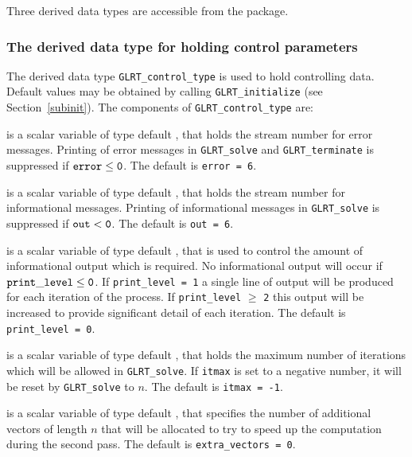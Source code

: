 \documentclass{galahad}
\newcommand{\packagename}{GL\-RT}
\begin{document}

\galtypes
Three derived data types are accessible from the package.


\subsubsection{The derived data type for holding control
 parameters}\label{typecontrol}
The derived data type
{\tt \packagename\_control\_type}
is used to hold controlling data. Default values may be obtained by calling
{\tt \packagename\_initialize}
(see Section~\ref{subinit}). The components of
{\tt \packagename\_control\_type}
are:

\begin{description}
 is a scalar variable of type default \integer, that holds the
stream number for error messages.
Printing of error messages in
{\tt \packagename\_solve} and {\tt \packagename\_terminate}
is suppressed if ${\tt error} \leq {\tt 0}$.
The default is {\tt error = 6}.

 is a scalar variable of type default \integer, that holds the
stream number for informational messages.
Printing of informational messages in
{\tt \packagename\_solve} is suppressed if ${\tt out} < {\tt 0}$.
The default is {\tt out = 6}.

 is a scalar variable of type default \integer,
that is used
to control the amount of informational output which is required. No
informational output will occur if ${\tt print\_level} \leq {\tt 0}$. If
{\tt print\_level = 1} a single line of output will be produced for each
iteration of the process. If {\tt print\_level} $\geq$ {\tt 2} this output
will be increased to provide significant detail of each iteration.
The default is {\tt print\_level = 0}.

 is a scalar variable of type default \integer, that holds the
maximum number of iterations which will be allowed in
{\tt \packagename\_solve}.
If {\tt itmax} is set to a negative number, it will be reset by
{\tt \packagename\_solve} to $n$.
The default is {\tt itmax = -1}.

 is a scalar variable of type default \integer,
that specifies the number of additional vectors of length $n$
that will be allocated to try to speed up the computation during the
second pass.
The default is {\tt extra\_vectors = 0}.


\end{description}
\end{document}
